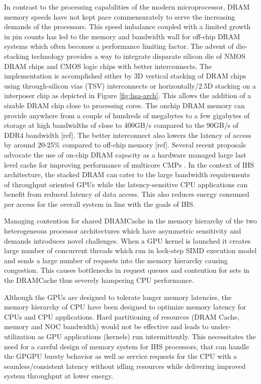 \par In contrast to the processing capabilities of the modern microprocessor, DRAM memory speeds have not kept pace commensurately to serve the increasing demands of the processors. This speed imbalance coupled with a limited growth in pin counts has led to the memory and bandwidth wall \cite{memory-wall,bandwidth-wall} for off-chip DRAM systems which often becomes a performance limiting factor. The advent of die-stacking technology \cite{3d-stacking} provides a way to integrate disparate silicon die of NMOS DRAM chips and CMOS logic chips with better interconnects. The implementation is accomplished either by 3D vertical stacking of DRAM chips using through-silicon vias (TSV) interconnects or horizontally/2.5D stacking on a interposer chip as depicted in Figure \ref{fig:hsa-arch}. This allows the addition of a sizable DRAM chip close to processing cores. The onchip DRAM memory can provide anywhere from a couple of hundreds of megabytes to a few gigabytes of storage at high bandwidths of close to 400GB/s compared to the 90GB/s of DDR4 bandwidth [ref]. The better interconnect also lowers the latency of access by around 20-25\% compared to off-chip memory [ref]. Several recent proposals advocate the use of on-chip DRAM capacity as a hardware managed large last level cache for improving performance of multicore CMPs \cite{alloy,bimodal,loh-hill,atcache}. In the context of IHS architecture, the stacked DRAM can cater to the large bandwidth requirements of throughput oriented GPUs while the latency-sensitive CPU applications can benefit from reduced latency of data access. This also reduces energy consumed per access for the overall system in line with the goals of IHS.
\par Managing contention for shared DRAMCache in the memory hierarchy of the two heterogeneous processor architectures which have asymmetric sensitivity and demands introduces novel challenges. When a GPU kernel is launched it creates large number of concurrent threads which run in lock-step SIMD execution model and sends a large number of requests into the memory hierarchy causing congestion. This causes bottlenecks in request queues and contention for sets in the DRAMCache thus severely hampering CPU performance. 

Although the GPUs are designed to tolerate longer memory latencies, the memory hierarchy of CPU have been designed to optimize memory latency for CPUs and CPU applications.
Hard partitioning of resources (DRAM Cache, memory and NOC bandwidth) would not be effective and leads to under-utilization as GPU applications (kernels) run intermittently. 
This necessitates the need for a careful design of memory system for IHS processors, that can handle the GPGPU bursty behavior as well as service requests for the CPU with a seamless/consistent latency without idling resources while delivering improved system throughput at lower energy.

